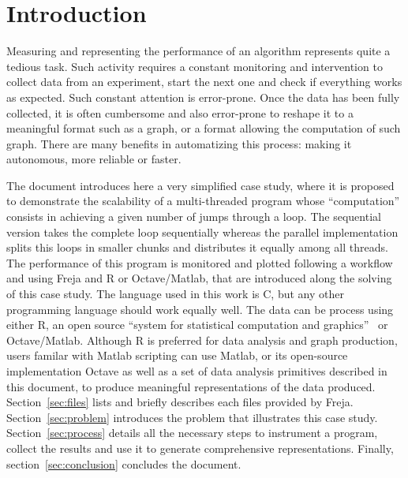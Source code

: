 
\section{Introduction}
Measuring and representing the performance of an algorithm represents quite a tedious task. Such activity requires a constant monitoring and intervention to collect data from an experiment, start the next one and check if everything works as expected. Such constant attention is error-prone. Once the data has been fully collected, it is often cumbersome and also error-prone to reshape it to a meaningful format such as a graph, or a format allowing the computation of such graph. There are many benefits in automatizing this process: making it autonomous, more reliable or faster.

The document introduces here a very simplified case study, where it is proposed to demonstrate the scalability of a multi-threaded program whose ``computation'' consists in achieving a given number of jumps through a loop. The sequential version takes the complete loop sequentially whereas the parallel implementation splits this loops in smaller chunks and distributes it equally among all threads. The performance of this program is monitored and plotted following a workflow and using Freja and R or Octave/Matlab, that are introduced along the solving of this case study. The language used in this work is {C}, but any other programming language should work equally well. The data can be process using either R, an open source ``system for statistical computation and graphics''~\cite{hornik14} or Octave/Matlab. Although R is preferred for data analysis and graph production, users familar with Matlab scripting can use Matlab, or its open-source implementation Octave as well as a set of data analysis primitives described in this document, to produce meaningful representations of the data produced. Section~\ref{sec:files} lists and briefly describes each files provided by Freja. Section~\ref{sec:problem} introduces the problem that illustrates this case study. Section~\ref{sec:process} details all the necessary steps to instrument a program, collect the results and use it to generate comprehensive representations. Finally, section~\ref{sec:conclusion} concludes the document.

